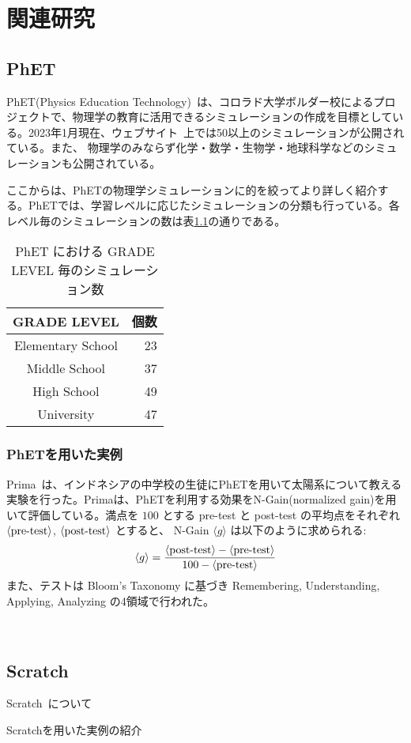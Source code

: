 \chapter{関連研究} \label{related}

\section{PhET}

PhET(Physics Education Technology)~\cite{Perkins2006PhETIS}は、コロラド大学ボルダー校によるプロジェクトで、物理学の教育に活用できるシミュレーションの作成を目標としている。2023年1月現在、ウェブサイト~\cite{PhET}上では50以上のシミュレーションが公開されている。また、
物理学のみならず化学・数学・生物学・地球科学などのシミュレーションも公開されている。

ここからは、PhETの物理学シミュレーションに的を絞ってより詳しく紹介する。PhETでは、学習レベルに応じたシミュレーションの分類も行っている。各レベル毎のシミュレーションの数は表\ref{PhET_sim_count_table}の通りである。

\begin{table}[htb]
\centering
\caption{PhET における GRADE LEVEL 毎のシミュレーション数} \label{PhET_sim_count_table}
\begin{tabular}{cr}
  GRADE LEVEL & 個数 \\
  \hline
  Elementary School & 23 \\
  Middle School & 37 \\
  High School & 49 \\
  University & 47 \\
\end{tabular}
\end{table}

\subsection{PhETを用いた実例}

Prima~\cite{prima_learning_2018}は、インドネシアの中学校の生徒にPhETを用いて太陽系について教える実験を行った。Primaは、PhETを利用する効果をN-Gain(normalized gain)を用いて評価している。満点を $100$ とする pre-test と post-test の平均点をそれぞれ $\langle \textrm{pre\\-test} \rangle$, $\langle \textrm{post\\-test} \rangle$ とすると、 N-Gain $\langle g \rangle$ は以下のように求められる:
$$ \langle g \rangle = \dfrac{\langle \textrm{post\\-test} \rangle - \langle \textrm{pre\\-test} \rangle}{100 - \langle \textrm{pre\\-test} \rangle} $$
また、テストは Bloom's Taxonomy に基づき Remembering, Understanding, Applying, Analyzing の4領域で行われた。


~\cite{rehman_teaching_2021}

\section{Scratch}

Scratch~\cite{Scratch}について

Scratchを用いた実例の紹介
~\cite{Lpez2015ScratchAA}

